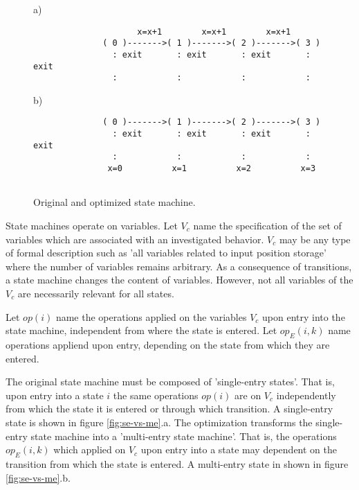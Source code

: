 \documentclass[12pt,a4paper]{scrartcl}
\begin{document}
\begin{figure}[htbp] \leavevmode \label{fig:two-state-machines}
a)
\begin{verbatim}
                     x=x+1        x=x+1        x=x+1
              ( 0 )------->( 1 )------->( 2 )------->( 3 )
                : exit       : exit       : exit       : exit
                :            :            :            :
\end{verbatim}
    
b)
\begin{verbatim}
              ( 0 )------->( 1 )------->( 2 )------->( 3 )
                : exit       : exit       : exit       : exit
                :            :            :            :
               x=0          x=1          x=2          x=3
    
\end{verbatim}
\caption{Original and optimized state machine.}
\end{figure}
                 
State machines operate on variables. Let $V_c$ name the specification of the
set of variables which are associated with an investigated behavior.  $V_c$ may
be any type of formal description such as 'all variables related to input
position storage' where the number of variables remains arbitrary.  As a
consequence of transitions, a state machine changes the content of variables.
However, not all variables of the $V_c$ are necessarily relevant for all
states. 

Let $op(i)$ name the operations applied on the variables $V_c$ upon entry into
the state machine, independent from where the state is entered. Let $op_E(i,k)$
name operations appliend upon entry, depending on the state from which they are
entered.

The original state machine must be composed of 'single-entry states'. That is,
upon entry into a state $i$ the same operations $op(i)$ are on $V_c$
independently from which the state it is entered or through which transition.
A single-entry state is shown in figure \ref{fig:se-vs-me}.a. The optimization
transforms the single-entry state machine into a 'multi-entry state machine'.
That is, the operations $op_E(i,k)$ which applied on $V_c$ upon entry into a
state may dependent on the transition from which the state is entered. A
multi-entry state in shown in figure \ref{fig:se-vs-me}.b.
\end{document}

